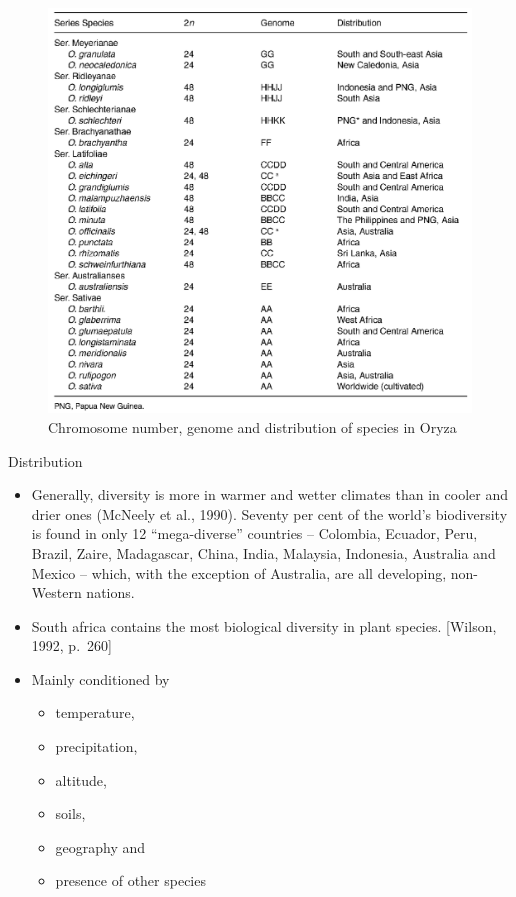 \documentclass[
  ignorenonframetext,
  aspectratio=169]{beamer}
\providecommand{\tightlist}{%
  \setlength{\itemsep}{0pt}\setlength{\parskip}{0pt}}
\begin{document}
\begin{frame}{}
\protect\hypertarget{section-9}{}
\begin{figure}
\includegraphics[width=0.5\linewidth]{./../images/oryza_distribution_chromosome} \caption{Chromosome number, genome and distribution of species in Oryza}\label{fig:chromosome-distribution-oryza}
\end{figure}
\end{frame}

\begin{frame}{Distribution}
\protect\hypertarget{distribution}{}
\begin{itemize}
\item
  Generally, diversity is more in warmer and wetter climates than in
  cooler and drier ones (McNeely et al., 1990). Seventy per cent of the
  world's biodiversity is found in only 12 ``mega-diverse'' countries --
  Colombia, Ecuador, Peru, Brazil, Zaire, Madagascar, China, India,
  Malaysia, Indonesia, Australia and Mexico -- which, with the exception
  of Australia, are all developing, non-Western nations.
\item
  South africa contains the most biological diversity in plant species.
  {[}Wilson, 1992, p.~260{]}
\item
  Mainly conditioned by

  \begin{itemize}
  \tightlist
  \item
    temperature,
  \item
    precipitation,
  \item
    altitude,
  \item
    soils,
  \item
    geography and
  \item
    presence of other species
  \end{itemize}
\end{itemize}
\end{frame}
\end{document}
